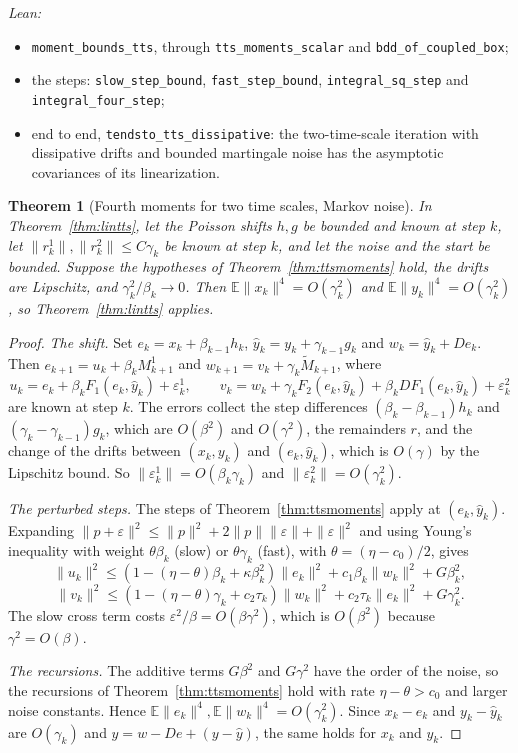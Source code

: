 \documentclass[11pt]{article}
\newtheorem{theorem}{Theorem}[section]
\theoremstyle{definition}
\theoremstyle{remark}
\newcommand{\E}{\mathbb{E}}
\begin{document}
\noindent\emph{Lean:}
\begin{itemize}
\item \texttt{moment\_bounds\_tts}, through \texttt{tts\_moments\_scalar} and \texttt{bdd\_of\_coupled\_box};
\item the steps: \texttt{slow\_step\_bound}, \texttt{fast\_step\_bound}, \texttt{integral\_sq\_step} and
  \texttt{integral\_four\_step};
\item end to end, \texttt{tendsto\_tts\_dissipative}: the two-time-scale iteration with dissipative drifts
  and bounded martingale noise has the asymptotic covariances of its linearization.
\end{itemize}

\begin{theorem}[Fourth moments for two time scales, Markov noise]\label{thm:ttsmarkov}
In Theorem~\ref{thm:lintts}, let the Poisson shifts $h, g$ be bounded and known at step $k$, let
$\|r^1_k\|, \|r^2_k\| \le C\gamma_k$ be known at step $k$, and let the noise and
the start be bounded. Suppose the hypotheses of Theorem~\ref{thm:ttsmoments} hold, the drifts are
Lipschitz, and $\gamma_k^2/\beta_k \to 0$. Then $\E\|x_k\|^4 = O(\gamma_k^2)$ and
$\E\|y_k\|^4 = O(\gamma_k^2)$, so Theorem~\ref{thm:lintts} applies.
\end{theorem}
\begin{proof}
\emph{The shift.} Set $e_k = x_k + \beta_{k-1}h_k$, $\hat y_k = y_k + \gamma_{k-1}g_k$ and
$w_k = \hat y_k + De_k$. Then $e_{k+1} = u_k + \beta_kM^1_{k+1}$ and
$w_{k+1} = v_k + \gamma_k\tilde M_{k+1}$, where
\[
  u_k = e_k + \beta_kF_1(e_k, \hat y_k) + \varepsilon^1_k,\qquad
  v_k = w_k + \gamma_kF_2(e_k, \hat y_k) + \beta_kDF_1(e_k, \hat y_k) + \varepsilon^2_k
\]
are known at step $k$. The errors collect the step differences $(\beta_k - \beta_{k-1})h_k$ and
$(\gamma_k - \gamma_{k-1})g_k$, which are $O(\beta^2)$ and $O(\gamma^2)$, the remainders $r$, and the
change of the drifts between $(x_k, y_k)$ and $(e_k, \hat y_k)$, which is $O(\gamma)$ by the
Lipschitz bound. So $\|\varepsilon^1_k\| = O(\beta_k\gamma_k)$ and $\|\varepsilon^2_k\| = O(\gamma_k^2)$.

\emph{The perturbed steps.} The steps of Theorem~\ref{thm:ttsmoments} apply at $(e_k, \hat y_k)$.
Expanding $\|p + \varepsilon\|^2 \le \|p\|^2 + 2\|p\|\|\varepsilon\| + \|\varepsilon\|^2$ and
using Young's inequality with weight $\theta\beta_k$ (slow) or $\theta\gamma_k$ (fast), with
$\theta = (\eta - c_0)/2$, gives
\[
  \|u_k\|^2 \le (1 - (\eta - \theta)\beta_k + \kappa\beta_k^2)\|e_k\|^2 + c_1\beta_k\|w_k\|^2 + G\beta_k^2,
\]
\[
  \|v_k\|^2 \le (1 - (\eta - \theta)\gamma_k + c_2\tau_k)\|w_k\|^2 + c_2\tau_k\|e_k\|^2 + G\gamma_k^2 .
\]
The slow cross term costs $\varepsilon^2/\beta = O(\beta\gamma^2)$, which is $O(\beta^2)$ because
$\gamma^2 = O(\beta)$.

\emph{The recursions.} The additive terms $G\beta^2$ and $G\gamma^2$ have the order of the noise, so
the recursions of Theorem~\ref{thm:ttsmoments} hold with rate $\eta - \theta > c_0$ and larger noise
constants. Hence $\E\|e_k\|^4, \E\|w_k\|^4 = O(\gamma_k^2)$. Since $x_k - e_k$ and $y_k - \hat y_k$ are
$O(\gamma_k)$ and $y = w - De + (y - \hat y)$, the same holds for $x_k$ and $y_k$.
\end{proof}
\end{document}
